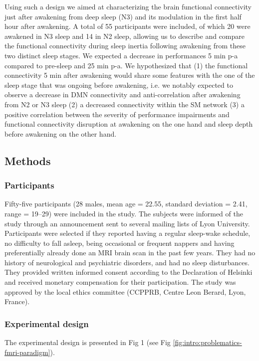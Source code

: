 Using such a design we aimed at characterizing the brain functional connectivity just after awakening from deep sleep (N3) and its modulation in the first half hour after awakening. A total of 55 participants were included, of which 20 were awakened in N3 sleep and 14 in N2 sleep, allowing us to describe and compare the functional connectivity during sleep inertia following awakening from these two distinct sleep stages. We expected a decrease in performances 5 min p-a compared to pre-sleep and 25 min p-a. We hypothesized that (1) the functional connectivity 5 min after awakening would share some features with the one of the sleep stage that was ongoing before awakening, i.e. we notably expected to observe a decrease in DMN connectivity and anti-correlation after awakening from N2 or N3 sleep (2) a decreased connectivity within the SM network (3) a positive correlation between the severity of performance impairments and functional connectivity disruption at awakening on the one hand and sleep depth before awakening on the other hand.

\subsection*{Methods}
\label{res:inertia:inertia:methods}

\subsubsection*{Participants}
Fifty-five participants (28 males, mean age = 22.55, standard deviation = 2.41, range = 19–29) were included in the study. The subjects were informed of the study through an announcement sent to several mailing lists of Lyon University. Participants were selected if they reported having a regular sleep-wake schedule, no difficulty to fall asleep, being occasional or frequent nappers and having preferentially already done an MRI brain scan in the past few years. They had no history of neurological and psychiatric disorders, and had no sleep disturbances. They provided written informed consent according to the Declaration of Helsinki and received monetary compensation for their participation. The study was approved by the local ethics committee (CCPPRB, Centre Leon Berard, Lyon, France).

\subsubsection*{Experimental design}
The experimental design is presented in Fig 1 (see Fig \ref{fig:intro:problematics-fmri-paradigm}).


